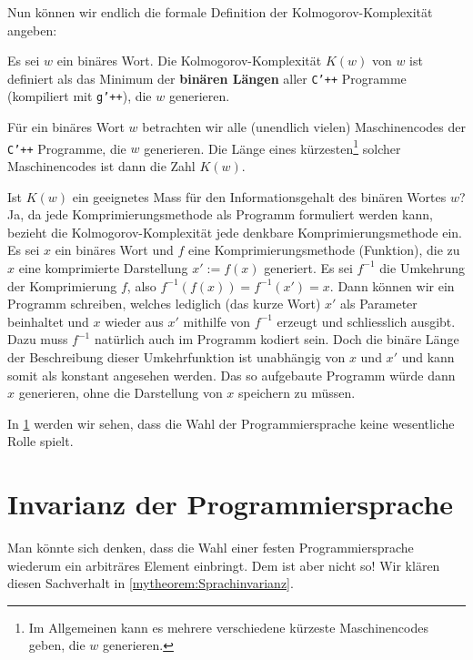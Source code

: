 Nun können wir endlich die formale Definition der Kolmogorov-Komplexität angeben:
\begin{mydefinition}\label{mydefinition:kolmogorov}
Es sei $w$ ein binäres Wort. Die Kolmogorov-Komplexität $K(w)$ von $w$ ist definiert als das Minimum der \textbf{binären Längen} aller \texttt{C'++} Programme (kompiliert mit \texttt{g'++}), die $w$ generieren.
\end{mydefinition}
Für ein binäres Wort $w$ betrachten wir alle (unendlich vielen) Maschinencodes der \texttt{C'++} Programme, die $w$ generieren. Die Länge eines kürzesten\footnote{Im Allgemeinen kann es mehrere verschiedene kürzeste Maschinencodes geben, die $w$ generieren.} solcher Maschinencodes ist dann die Zahl $K(w)$.
\begin{myremark}
	Ist $K(w)$ ein geeignetes Mass für den Informationsgehalt des binären Wortes $w$? Ja, da jede Komprimierungsmethode als Programm formuliert werden kann, bezieht die Kolmogorov-Komplexität jede denkbare Komprimierungsmethode ein. Es sei $x$ ein binäres Wort und $f$ eine Komprimierungsmethode (Funktion), die zu $x$ eine komprimierte Darstellung $x' := f(x)$ generiert. Es sei $f^{-1}$ die Umkehrung der Komprimierung $f$, also $f^{-1}(f(x)) = f^{-1}(x') = x$. Dann können wir ein Programm schreiben, welches lediglich (das kurze Wort) $x'$ als Parameter beinhaltet und $x$ wieder aus $x'$ mithilfe von $f^{-1}$ erzeugt und schliesslich ausgibt. Dazu muss $f^{-1}$ natürlich auch im Programm kodiert sein. Doch die binäre Länge der Beschreibung dieser Umkehrfunktion ist unabhängig von $x$ und $x'$ und kann somit als konstant angesehen werden. Das so aufgebaute Programm würde dann $x$ generieren, ohne die Darstellung von $x$ speichern zu müssen.
\end{myremark}
In \cref{sec:Sprachinvarianz} werden wir sehen, dass die Wahl der Programmiersprache keine wesentliche Rolle spielt.

\section{Invarianz der Programmiersprache}\label{sec:Sprachinvarianz}
Man könnte sich denken, dass die Wahl einer festen Programmiersprache wiederum ein arbiträres Element einbringt. Dem ist aber nicht so! Wir klären diesen Sachverhalt in \cref{mytheorem:Sprachinvarianz}.

